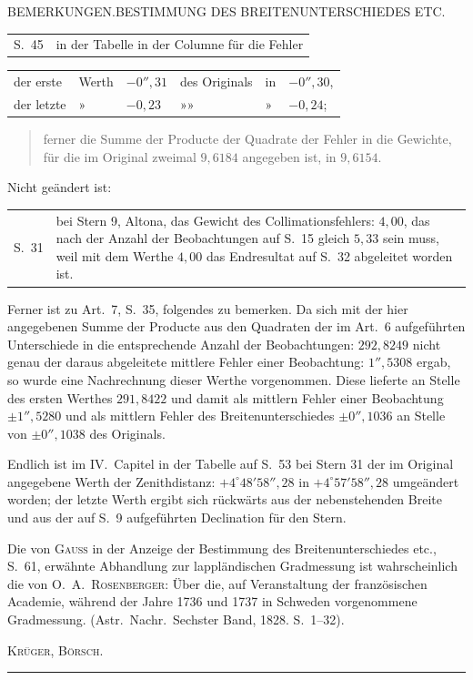 \clearpage
\noindent{}\parbox{\dimexpr\linewidth-4em\relax}{\centering\small BEMERKUNGEN.\quad BESTIMMUNG DES BREITENUNTERSCHIEDES ETC.}\hfill\mbox{}\par
{\small
\par\noindent\begin{tabular}{@{}p{.065\linewidth}p{.91\linewidth}@{}}
S.\ 45&in der Tabelle in der Columne für die Fehler
\end{tabular}
\begin{center}
\par\noindent\begin{tabular}{llllll}
der erste&Werth&$-0''{,}31$&des Originals&in&$-0''{,}30$,\\
der letzte&»&$-0{,}23$&»\quad »&»&$-0{,}24$;
\end{tabular}
\end{center}
\begin{quote}
ferner die Summe der Producte der Quadrate der Fehler in die Gewichte, für die im Original zweimal $9{,}6184$ angegeben ist, in $9{,}6154$.
\end{quote}
Nicht geändert ist:
\par\noindent\begin{tabular}{@{}p{.065\linewidth}p{.91\linewidth}@{}}
S.\ 31&bei Stern 9, Altona, das Gewicht des Collimationsfehlers: $4{,}00$, das nach der Anzahl der Beobachtungen auf S.\ 15 gleich $5{,}33$ sein muss, weil mit dem Werthe $4{,}00$ das Endresultat auf S.\ 32 abgeleitet worden ist.
\end{tabular}

Ferner ist zu Art.\ 7, S.\ 35, folgendes zu bemerken. Da sich mit der hier angegebenen Summe der Producte aus den Quadraten der im Art.\ 6 aufgeführten Unterschiede in die entsprechende Anzahl der Beobachtungen: $292{,}8249$ nicht genau der daraus abgeleitete mittlere Fehler einer Beobachtung: $1''{,}5308$ ergab, so wurde eine Nachrechnung dieser Werthe vorgenommen. Diese lieferte an Stelle des ersten Werthes $291{,}8422$ und damit als mittlern Fehler einer Beobachtung $\pm1''{,}5280$ und als mittlern Fehler des Breitenunterschiedes $\pm0''{,}1036$ an Stelle von $\pm0''{,}1038$ des Originals.

Endlich ist im IV.\ Capitel in der Tabelle auf S.\ 53 bei Stern 31 der im Original angegebene Werth der Zenithdistanz: $+4^\circ48'58''{,}28$ in $+4^\circ57'58''{,}28$ umgeändert worden; der letzte Werth ergibt sich rückwärts aus der nebenstehenden Breite und aus der auf S.\ 9 aufgeführten Declination für den Stern.

Die von \textsc{Gauss} in der Anzeige der Bestimmung des Breitenunterschiedes etc., S.\ 61, erwähnte Abhandlung zur lappländischen Gradmessung ist wahrscheinlich die von O.\ A.\ \textsc{Rosenberger}: Über die, auf Veranstaltung der französischen Academie, während der Jahre 1736 und 1737 in Schweden vorgenommene Gradmessung. (Astr.\ Nachr.\ Sechster Band, 1828. S.\ 1--32).
\par\hfill\textsc{Krüger, Börsch.}\par
}
\begin{center}\rule{.25\textwidth}{.4pt}\end{center}

